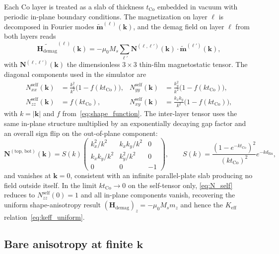 \documentclass[11pt,a4paper]{article}
\newcommand{\mb}[1]{\mathbf{#1}}
\newcommand{\Hdemag}{\mb{H}_{\text{demag}}}
\newcommand{\tCo}{t_{\text{Co}}}
\newcommand{\dRu}{d_{\text{Ru}}}
\newcommand{\Keff}{K_{\text{eff}}}
\newcommand{\Ms}{M_s}
\begin{document}
Each Co layer is treated as a slab of thickness $\tCo$
embedded in vacuum with periodic in-plane boundary conditions.
The magnetization on layer $\ell$ is decomposed in Fourier
modes $\widetilde{\mb{m}}^{(\ell)}(\mb{k})$, and the demag
field on layer $\ell$ from both layers reads
%
\begin{equation}\label{eq:demag_k}
\widetilde{\Hdemag}^{(\ell)}(\mb{k})
    = -\mu_0 \Ms \sum_{\ell'} \mb{N}^{(\ell, \ell')}(\mb{k})
        \cdot \widetilde{\mb{m}}^{(\ell')}(\mb{k}),
\end{equation}
%
with $\mb{N}^{(\ell, \ell')}(\mb{k})$ the dimensionless
$3 \times 3$ thin-film magnetostatic tensor. The diagonal
components used in the simulator are
%
\begin{align}
N_{xx}^{\text{self}}(\mb{k}) &= \frac{k_x^2}{k^2}
    \bigl(1 - f(k\tCo)\bigr), &
N_{yy}^{\text{self}}(\mb{k}) &= \frac{k_y^2}{k^2}
    \bigl(1 - f(k\tCo)\bigr), \nonumber\\
N_{zz}^{\text{self}}(\mb{k}) &= f(k\tCo), &
N_{xy}^{\text{self}}(\mb{k}) &= \frac{k_x k_y}{k^2}
    \bigl(1 - f(k\tCo)\bigr),
\label{eq:N_self}
\end{align}
%
with $k = |\mb{k}|$ and $f$ from~\eqref{eq:shape_function}.
The inter-layer tensor uses the same in-plane structure
multiplied by an exponentially decaying gap factor and an
overall sign flip on the out-of-plane component:
%
\begin{equation}\label{eq:N_inter}
\mb{N}^{(\text{top, bot})}(\mb{k})
    = S(k) \begin{pmatrix}
        k_x^2 / k^2 & k_x k_y / k^2 & 0 \\
        k_x k_y / k^2 & k_y^2 / k^2 & 0 \\
        0 & 0 & -1
    \end{pmatrix},
\qquad
S(k) = \frac{(1 - e^{-k\tCo})^2}{(k\tCo)^2}
    e^{-k\dRu},
\end{equation}
%
and vanishes at $\mb{k} = 0$, consistent with an infinite
parallel-plate slab producing no field outside itself. In
the limit $k\tCo \to 0$ on the self-tensor only,
\eqref{eq:N_self} reduces to $N_{zz}^{\text{self}}(0) = 1$ and
all in-plane components vanish, recovering the uniform
shape-anisotropy result
$(\Hdemag)_z = -\mu_0 \Ms m_z$ and
hence the $\Keff$ relation~\eqref{eq:keff_uniform}.

\subsection{Bare anisotropy at finite $\mb{k}$}
\end{document}
